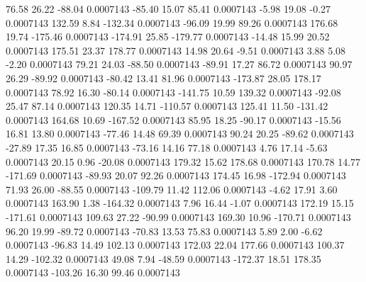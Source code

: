        76.58       26.22      -88.04     0.0007143
      -85.40       15.07       85.41     0.0007143
       -5.98       19.08       -0.27     0.0007143
      132.59        8.84     -132.34     0.0007143
      -96.09       19.99       89.26     0.0007143
      176.68       19.74     -175.46     0.0007143
     -174.91       25.85     -179.77     0.0007143
      -14.48       15.99       20.52     0.0007143
      175.51       23.37      178.77     0.0007143
       14.98       20.64       -9.51     0.0007143
        3.88        5.08       -2.20     0.0007143
       79.21       24.03      -88.50     0.0007143
      -89.91       17.27       86.72     0.0007143
       90.97       26.29      -89.92     0.0007143
      -80.42       13.41       81.96     0.0007143
     -173.87       28.05      178.17     0.0007143
       78.92       16.30      -80.14     0.0007143
     -141.75       10.59      139.32     0.0007143
      -92.08       25.47       87.14     0.0007143
      120.35       14.71     -110.57     0.0007143
      125.41       11.50     -131.42     0.0007143
      164.68       10.69     -167.52     0.0007143
       85.95       18.25      -90.17     0.0007143
      -15.56       16.81       13.80     0.0007143
      -77.46       14.48       69.39     0.0007143
       90.24       20.25      -89.62     0.0007143
      -27.89       17.35       16.85     0.0007143
      -73.16       14.16       77.18     0.0007143
        4.76       17.14       -5.63     0.0007143
       20.15        0.96      -20.08     0.0007143
      179.32       15.62      178.68     0.0007143
      170.78       14.77     -171.69     0.0007143
      -89.93       20.07       92.26     0.0007143
      174.45       16.98     -172.94     0.0007143
       71.93       26.00      -88.55     0.0007143
     -109.79       11.42      112.06     0.0007143
       -4.62       17.91        3.60     0.0007143
      163.90        1.38     -164.32     0.0007143
        7.96       16.44       -1.07     0.0007143
      172.19       15.15     -171.61     0.0007143
      109.63       27.22      -90.99     0.0007143
      169.30       10.96     -170.71     0.0007143
       96.20       19.99      -89.72     0.0007143
      -70.83       13.53       75.83     0.0007143
        5.89        2.00       -6.62     0.0007143
      -96.83       14.49      102.13     0.0007143
      172.03       22.04      177.66     0.0007143
      100.37       14.29     -102.32     0.0007143
       49.08        7.94      -48.59     0.0007143
     -172.37       18.51      178.35     0.0007143
     -103.26       16.30       99.46     0.0007143
